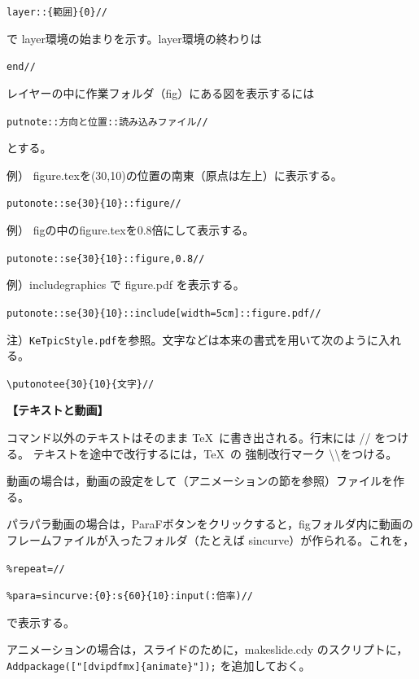 \documentclass[papersize,a4paper,12pt,uplatex]{jsarticle}
\begin{document}
\hspace{10mm}\verb|layer::{範囲}{0}//|

で layer環境の始まりを示す。layer環境の終わりは 

\hspace{10mm}\verb|end//|
 
 レイヤーの中に作業フォルダ（fig）にある図を表示するには
 
\hspace{10mm}\verb|putnote::方向と位置::読み込みファイル//|
 
とする。
 
 例） figure.texを(30,10)の位置の南東（原点は左上）に表示する。
 
\hspace{10mm} \verb|putonote::se{30}{10}::figure//|

 例） figの中のfigure.texを0.8倍にして表示する。
 
\hspace{10mm} \verb|putonote::se{30}{10}::figure,0.8//|
 

 例）includegraphics で figure.pdf を表示する。
 
\hspace{10mm} \verb|putonote::se{30}{10}::include[width=5cm]::figure.pdf//|
 
 
 注）\verb|KeTpicStyle.pdf|を参照。文字などは本来の書式を用いて次のように入れる。
 
\hspace{10mm} \verb|\putonotee{30}{10}{文字}//|

\vspace{\baselineskip}
{\bf 【テキストと動画】}
 
コマンド以外のテキストはそのまま \TeX\ に書き出される。行末には // をつける。
テキストを途中で改行するには，\TeX\ の 強制改行マーク \textbackslash \textbackslash をつける。

動画の場合は，動画の設定をして（アニメーションの節を参照）ファイルを作る。

パラパラ動画の場合は，ParaFボタンをクリックすると，figフォルダ内に動画のフレームファイルが入ったフォルダ（たとえば sincurve）が作られる。これを，

\hspace{10mm} \verb|%repeat=//|
 
\hspace{10mm} \verb|%para=sincurve:{0}:s{60}{10}:input(:倍率)//|

で表示する。

アニメーションの場合は，スライドのために，makeslide.cdy のスクリプトに， \verb|Addpackage(["[dvipdfmx]{animate}"]);| を追加しておく。
\end{document}
